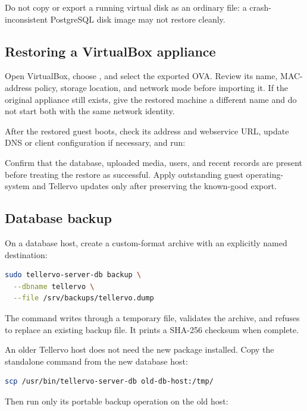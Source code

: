 Do not copy or export a running virtual disk as an ordinary file: a
crash-inconsistent PostgreSQL disk image may not restore cleanly.

\subsection{Restoring a VirtualBox appliance}

Open VirtualBox, choose , and select the
exported OVA. Review its name, MAC-address policy, storage location, and network
mode before importing it. If the original appliance still exists, give the
restored machine a different name and do not start both with the same network
identity.

After the restored guest boots, check its address and webservice URL, update
DNS or client configuration if necessary, and run:


Confirm that the database, uploaded media, users, and recent records are
present before treating the restore as successful. Apply outstanding guest
operating-system and Tellervo updates only after preserving the known-good
export.

\subsection{Database backup}
\label{txt:dbbackup}

On a database host, create a custom-format archive with an explicitly named
destination:

\begin{lstlisting}[language=bash]
sudo tellervo-server-db backup \
  --dbname tellervo \
  --file /srv/backups/tellervo.dump
\end{lstlisting}

The command writes through a temporary file, validates the archive, and refuses
to replace an existing backup file. It prints a SHA-256 checksum when complete.

An older Tellervo host does not need the new package installed. Copy the
standalone command from the new database host:

\begin{lstlisting}[language=bash]
scp /usr/bin/tellervo-server-db old-db-host:/tmp/
\end{lstlisting}

Then run only its portable backup operation on the old host:

